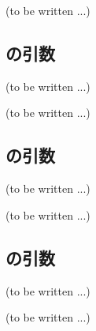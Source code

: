 \clearpage
(to be written ...)


\subsection{\KSotoMentoriRLeft の引数\TBW}
(to be written ...)



\clearpage
(to be written ...)


\subsection{\KUchiMentoriRLeft の引数\TBW}
(to be written ...)



\clearpage
(to be written ...)


\subsection{\KEndFaceBoring の引数\TBW}
(to be written ...)



\clearpage
(to be written ...)


